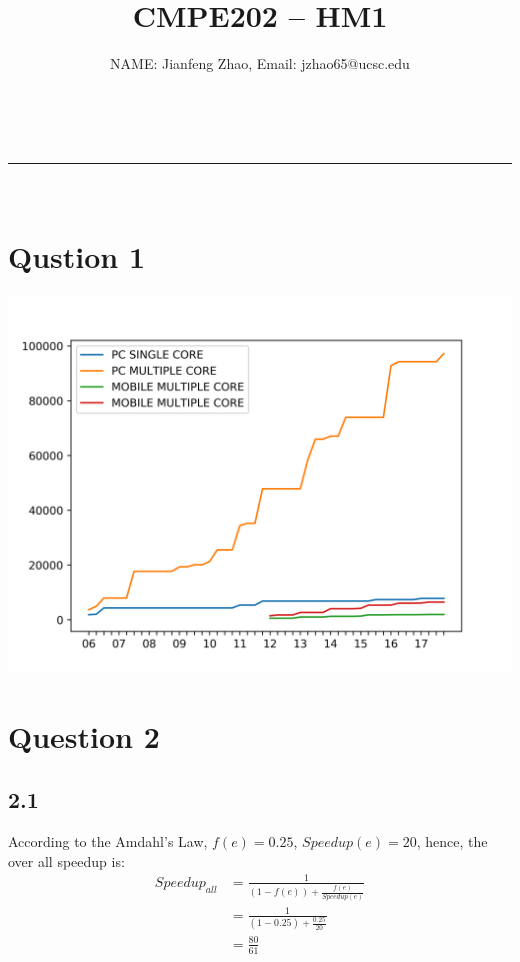 \documentclass[a4paper,11pt,fleqn]{article}
\makeatletter
\newcommand{\linia}{\rule{\linewidth}{0.5pt}}
\theoremstyle{mytheor}
\renewcommand{\maketitle}{
\begin{center}
\vspace{2ex}
{\huge \textsc{\@title}}
\vspace{1ex}
\\
\linia\\
\@author \hfill \@date
\vspace{4ex}
\end{center}
}
\makeatother
\begin{document}
\title{CMPE202 -- HM1}

\author{NAME: Jianfeng Zhao, Email: jzhao65@ucsc.edu}

\maketitle



\section*{Qustion 1}



\includegraphics{plot}

\section*{Question 2}
\subsection*{2.1}
According to the Amdahl's Law, $f(e) = 0.25$, $Speedup(e) = 20$, hence, the over all speedup is:
\begin{equation}
\begin{split}
Speedup_{all} &= \frac{1}{(1 - f(e)) + \frac{f(e)}{Speedup(e)}}\\
&=\frac{1}{(1 - 0.25) + \frac{0.25}{20}}\\
&=\frac{80}{61}
\nonumber
\end{split}
\end{equation}
\end{document}
